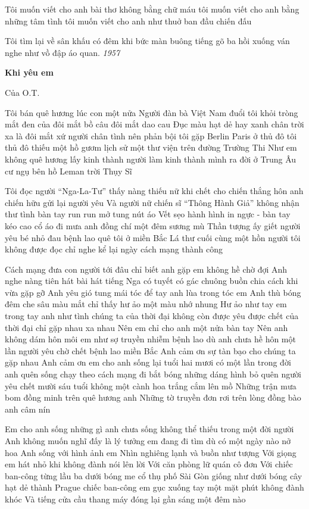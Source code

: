 \documentclass[../main.tex]{subfiles}
\begin{document}
\begin{multicols}{2}
Tôi muốn viết cho anh 
bài thơ không bằng chữ máu 
tôi muốn viết cho anh  
bằng những tâm tình 
tôi muốn viết cho anh 
như thuở ban đầu chiến đấu 
 
Tôi tìm lại về sân khấu 
có đêm khi bức màn buông 
tiếng gõ ba hồi xuống ván 
nghe như vồ đập áo quan. 
\textit{1957} 
 
        
\textbf{Khi yêu em}        
\begin{blockquote}
Của O.T.\end{blockquote}
 
 
Tôi bán quê hương lúc con một nửa 
Người đàn bà Việt Nam đuổi tôi khỏi tròng mắt đen 
của đôi mắt bồ câu 
đôi mắt dao cau 
Đục màu hạt dẻ 
hay xanh chân trời xa 
là đôi mắt xứ người chân tình nên phản bội  
tôi gặp Berlin 
Paris ở thủ đô tôi 
thủ đô thiếu một hồ gươm lịch sử  
một thư viện trên đường Trường Thi 
Như em không quê hương  
lấy kinh thành người làm kinh thành mình 
ra đời ở Trung Âu 
cư ngụ bên hồ Leman trời Thụy Sĩ 
 
Tôi đọc người “Nga-La-Tư” 
thấy nàng thiếu nữ 
khi chết cho chiến thắng 
hôn anh chiến hữu gửi lại người yêu  
Và người nữ chiến sĩ “Thông Hành Giả” 
không nhận thư tình 
bàn tay run run mở tung nút áo 
Vết sẹo hành hình in ngực  
- bàn tay kéo cao cổ áo đi mưa anh đồng chí một đêm sương mù 
Thần tượng ấy giết người yêu bé nhỏ 
đau bệnh lao quê tôi ở miền Bắc  
Lá thư cuối cùng một hồn người 
tôi không được đọc chỉ nghe kể lại 
ngày cách mạng thành công  
 
Cách mạng đưa con người tới đâu 
chỉ biết anh gặp em không hề chờ đợi 
Anh nghe nàng tiên hát bài hát tiếng Nga 
có tuyết có gác chuông 
buồn chia cách khi vừa gặp gỡ  
Anh yêu gió tung mái tóc 
để tay anh lùa trong tóc em 
Anh thù bóng đêm che sâu màu mắt 
chỉ thấy hư ảo một màu nhớ nhung 
Hư ảo như tay em trong tay anh 
như tình chúng ta  
của thời đại không còn được yêu được chết 
của thời đại chỉ gặp nhau xa nhau 
Nên em chỉ cho anh một nửa bàn tay  
Nên anh không dám hôn môi em 
như sợ truyền nhiễm bệnh lao 
dù anh chưa hề hôn một lần  
người yêu chờ chết bệnh lao miền Bắc 
Anh cảm ơn sự tàn bạo cho chúng ta gặp nhau 
Anh cảm ơn em cho anh sống lại tuổi hai mươi 
có một lần trong đời 
anh quên sống chạy theo cách mạng 
đi bắt bóng những dáng hình 
bỏ quên người yêu chết mười sáu tuổi 
không một cành hoa trắng cắm lên mồ  
Những trận mưa bom đồng minh trên quê hương anh 
Những tờ truyền đơn rơi trên lòng đồng bào anh câm nín 
 
Em cho anh sống những gì anh chưa sống 
không thể thiếu trong một đời người  
Anh không muốn nghĩ đấy là lý tưởng em đang đi tìm 
dù có một ngày nào nở hoa 
Anh sống với hình ảnh em 
Nhìn nghiêng lạnh và buồn như tượng 
Với giọng em hát nhỏ khi không đành nói lên lời 
Với căn phòng lữ quán cô đơn 
Với chiếc ban-công từng lầu ba dưới bóng me cổ thụ phố Sài Gòn 
giống như dưới bóng cây hạt dẻ thành Prague 
chiếc ban-công em gục xuống tay một mặt phút không đành khóc 
Và tiếng cửa cầu thang máy đóng lại gần sáng một đêm nào 
 

\end{multicols}
\end{document}
